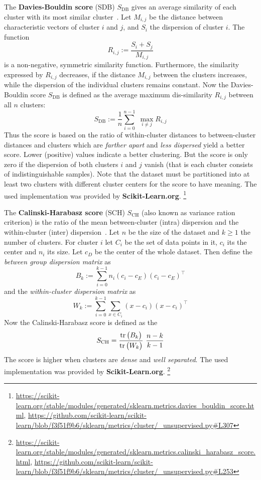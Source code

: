 	The \textbf{Davies-Bouldin score} (SDB) $S_{\text{DB}}$ gives an average similarity of each cluster with its most similar cluster~\cite{1979_Davies_IEEE}.
	Let $M_{i,j}$ be the distance between characteristic vectors of cluster $i$ and $j$, and $S_i$ the dispersion of cluster $i$.
	The function
	\[ R_{i,j} := \frac{S_i + S_j}{M_{i,j}} \]
	is a non-negative, symmetric similarity function. 	
	Furthermore, the similarity expressed by $R_{i,j}$ decreases, if the distance $M_{i,j}$ between the clusters increases, while the dispersion of the individual clusters remains constant.
	Now the Davies-Bouldin score $S_{\text{DB}}$ is defined as the average maximum dis-similarity $R_{i,j}$ between all $n$ clusters:
	\[ S_{\text{DB}} := \frac{1}{n}\sum_{i=0}^{n-1}\; \max\limits_{i\neq j} R_{i,j} \] 
	Thus the score is based on the ratio of within-cluster distances to between-cluster distances and clusters which are \textit{farther apart} and \textit{less dispersed} yield a better score.
	Lower (positive) values indicate a better clustering.
	But the score is only zero if the dispersion of both clusters $i$ and $j$ vanish (that is each cluster consists of indistinguishable samples).	
	Note that the dataset must be partitioned into at least two clusters with different cluster centers for the score to have meaning.
	The used implementation was provided by \textbf{Scikit-Learn.org}.
	\footnote{ \url{https://scikit-learn.org/stable/modules/generated/sklearn.metrics.davies_bouldin_score.html},	\url{https://github.com/scikit-learn/scikit-learn/blob/f3f51f9b6/sklearn/metrics/cluster/_unsupervised.py\#L307} }
	
	The \textbf{Calinski-Harabasz score} (SCH) $S_{\text{CH}}$ (also known as variance ration criterion) is the ratio of the mean between-cluster (intra) dispersion and the within-cluster (inter) dispersion~\cite{1974_Calinski_CONF}.
	Let $n$ be the size of the dataset and $k\ge 1$ the number of clusters. 
	For cluster $i$ let $C_i$ be the set of data points in it, $c_i$ its the center and $n_i$ its size. Let $c_D$ be the center of the whole dataset.
	Then define the \textit{between group dispersion matrix} as
	\[ B_k := \sum_{i=0}^{k-1} n_i (c_i - c_E) (c_i - c_E)^\intercal \]
	and the \textit{within-cluster dispersion matrix} as
	\[ W_k := \sum_{i=0}^{k-1} \sum_{x \in C_i} (x - c_i) (x - c_i)^\intercal \]
	Now the Calinski-Harabasz score is defined as the 
	\[ S_{\text{CH}} = \frac{\mathop{\operatorname{tr}}\big(B_k\big)}{\mathop{\operatorname{tr}}\big(W_k\big)} \ \frac{n-k}{k-1} \]	
	The score is higher when clusters are \textit{dense} and \textit{well separated}.
	The used implementation was provided by \textbf{Scikit-Learn.org}.
	\footnote{ \url{https://scikit-learn.org/stable/modules/generated/sklearn.metrics.calinski_harabasz_score.html},	\url{https://github.com/scikit-learn/scikit-learn/blob/f3f51f9b6/sklearn/metrics/cluster/_unsupervised.py\#L253} }
